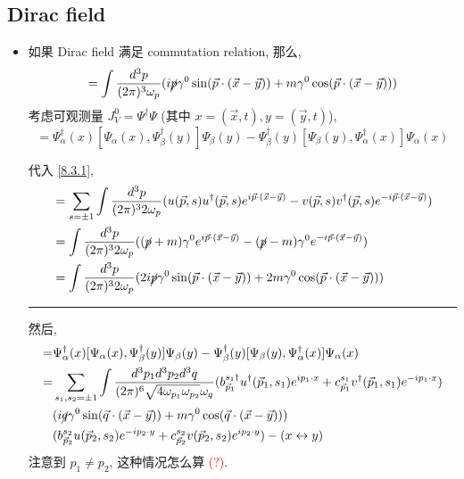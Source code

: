 \subsection{Dirac field}
\begin{itemize}
	\item 如果 Dirac field 满足 commutation relation, 那么,
	\begin{equation}
		[\Psi(\vec{x}, t), \Psi^\dag(\vec{y}, t)] = \int \frac{d^3 p}{(2 \pi)^3 \omega_p} (i \cancel{p} \gamma^0 \sin(\vec{p} \cdot (\vec{x} - \vec{y})) + m \gamma^0 \cos(\vec{p} \cdot (\vec{x} - \vec{y})))
	\end{equation}
	考虑可观测量 $J_V^0 = \Psi^\dag \Psi$ (其中 $x = (\vec{x}, t), y = (\vec{y}, t)$),
	\begin{equation}
		[J_V^0(x), J_V^0(y)] = \Psi^\dag_\alpha(x) [\Psi_\alpha(x), \Psi^\dag_\beta(y)] \Psi_\beta(y) - \Psi^\dag_\beta(y) [\Psi_\beta(y), \Psi^\dag_\alpha(x)] \Psi_\alpha(x)
	\end{equation}
	
	\begin{tcolorbox}[title=calculation:]
		代入 \eqref{8.3.1},
		\begin{align}
			[\Psi(\vec{x}, t), \Psi^\dag(\vec{y}, t)] &= \sum_{s = \pm 1} \int \frac{d^3 p}{(2 \pi)^3 2 \omega_p} (u(\vec{p}, s) u^\dag(\vec{p}, s) e^{i \vec{p} \cdot (\vec{x} - \vec{y})} - v(\vec{p}, s) v^\dag(\vec{p}, s) e^{- i \vec{p} \cdot (\vec{x} - \vec{y})}) \notag \\
			&= \int \frac{d^3 p}{(2 \pi)^3 2 \omega_p} ((\cancel{p} + m) \gamma^0 e^{i \vec{p} \cdot (\vec{x} - \vec{y})} - (\cancel{p} - m) \gamma^0 e^{- i \vec{p} \cdot (\vec{x} - \vec{y})}) \notag \\
			&= \int \frac{d^3 p}{(2 \pi)^3 2 \omega_p} (2 i \cancel{p} \gamma^0 \sin(\vec{p} \cdot (\vec{x} - \vec{y})) + 2 m \gamma^0 \cos(\vec{p} \cdot (\vec{x} - \vec{y})))
		\end{align}
		
		\noindent\rule[0.5ex]{\linewidth}{0.5pt} %
		
		然后,
		\begin{align}
			[J_V^0(x), J_V^0(y)] =& \Psi^\dag_\alpha(x) [\Psi_\alpha(x), \Psi^\dag_\beta(y)] \Psi_\beta(y) - \Psi^\dag_\beta(y) [\Psi_\beta(y), \Psi^\dag_\alpha(x)] \Psi_\alpha(x) \notag \\
			=& \sum_{s_1, s_2 = \pm 1} \int \frac{d^3 p_1 d^3 p_2 d^3 q}{(2 \pi)^6 \sqrt{4 \omega_{p_1} \omega_{p_2}} \omega_q} (b^{s_1 \dag}_{\vec{p}_1} u^\dag(\vec{p}_1, s_1) e^{i p_1 \cdot x} + c^{s_1}_{\vec{p}_1} v^\dag(\vec{p}_1, s_1) e^{- i p_1 \cdot x}) \notag \\
			& (i \cancel{q} \gamma^0 \sin(\vec{q} \cdot (\vec{x} - \vec{y})) + m \gamma^0 \cos(\vec{q} \cdot (\vec{x} - \vec{y}))) \notag \\
			& (b^{s_2}_{\vec{p}_2} u(\vec{p}_2, s_2) e^{- i p_2 \cdot y} + c^{s_2}_{\vec{p}_2} v(\vec{p}_2, s_2) e^{i p_2 \cdot y}) - (x \leftrightarrow y)
		\end{align}
		注意到 $p_1 \neq p_2$, 这种情况怎么算 \textcolor{red}{(?)}.
	\end{tcolorbox}
\end{itemize}
